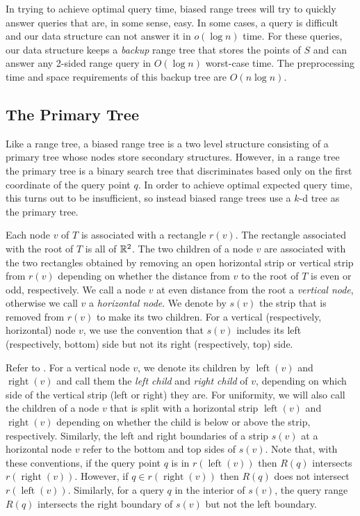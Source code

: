 \documentclass[lotsofwhite,charterfonts]{patmorin}
\DeclareMathOperator{\lft}{left}
\DeclareMathOperator{\rght}{right}
\begin{document}
In trying to achieve optimal query time, biased range trees will try
to quickly answer queries that are, in some sense, easy.  In some
cases, a query is difficult and our data structure can not answer it
in $o(\log n)$ time.  For these queries, our data structure keeps a
\emph{backup} range tree that stores the points of $S$ and can answer
any 2-sided range query in $O(\log n)$ worst-case time.  The
preprocessing time and space requirements of this backup tree are
$O(n\log n)$.

\subsection{The Primary Tree}

Like a range tree, a biased range tree is a two level structure
consisting of a primary tree whose nodes store secondary structures.
However, in a range tree the primary tree is a binary search tree that
discriminates based only on the first coordinate of the query point
$q$.  In order to achieve optimal expected query time, this turns out
to be insufficient, so instead biased range trees use a $k$-d tree
as the primary tree.

Each node $v$ of $T$ is associated with a rectangle $r(v)$.  The
rectangle associated with the root of $T$ is all of $\mathbb{R}^2$. The two
children of a node $v$ are associated with the two rectangles obtained
by removing an open horizontal strip or vertical strip from
$r(v)$ depending on whether the distance from $v$ to the root of $T$
is even or odd, respectively.  We call a node $v$ at even distance
from the root a \emph{vertical node}, otherwise we call $v$ a
\emph{horizontal node}.  We denote by $s(v)$ the strip that is removed
from $r(v)$ to make its two children.  For a vertical (respectively,
horizontal) node $v$, we use the convention that
$s(v)$ includes its left (respectively, bottom) side but not its
right (respectively, top) side.

Refer to .
For a vertical node $v$, we denote its children by $\lft(v)$ and
$\rght(v)$ and call them the \emph{left child} and \emph{right child}
of $v$, depending on which side of the vertical strip (left or right)
they are.  For uniformity, we will also call the children of a node
$v$ that is split with a horizontal strip $\lft(v)$ and $\rght(v)$
depending on whether the child is below or above the strip,
respectively.  Similarly, the left and right boundaries of a strip
$s(v)$ at a horizontal node $v$ refer to the bottom and top sides of
$s(v)$.  Note that, with these conventions, if the query point $q$ is
in $r(\lft(v))$ then $R(q)$ intersects $r(\rght(v))$.  However, if
$q\in r(\rght(v))$ then $R(q)$ does not intersect $r(\lft(v))$.
Similarly, for a query $q$ in the interior of $s(v)$, the query range
$R(q)$ intersects the right boundary of $s(v)$ but not the left
boundary.
\end{document}
